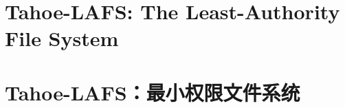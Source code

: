 \documentclass[master]{thesis-uestc}
\begin{document}
\thesistranslationoriginal
\section{Tahoe-LAFS: The Least-Authority File System}

\thesistranslationchinese
\section{Tahoe-LAFS：最小权限文件系统}
\end{document}
